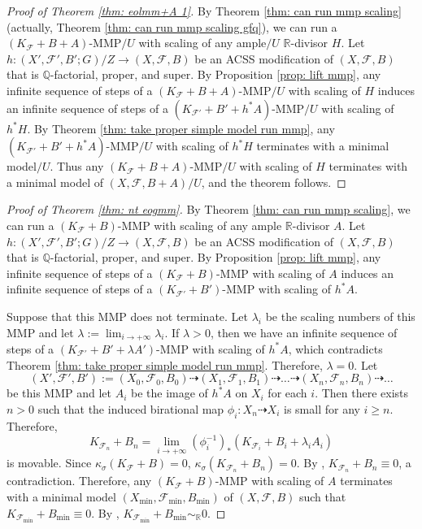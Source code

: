 \documentclass[11pt]{amsart}
\numberwithin{equation}{section}
\newcommand{\Qq}{\mathbb{Q}}
\newcommand{\Rr}{\mathbb{R}}
\newcommand{\Ff}{\mathcal{F}}
\theoremstyle{definition}
\theoremstyle{definition}
\theoremstyle{definition}
\begin{document}
\begin{proof}[Proof of Theorem \ref{thm: eolmm+A 1}]
By Theorem \ref{thm: can run mmp scaling} (actually, Theorem \ref{thm: can run mmp scaling gfq}), we can run a $(K_{\Ff}+B+A)$-MMP$/U$ with scaling of any ample$/U$ $\Rr$-divisor $H$. Let $h: (X',\Ff',B';G)/Z\rightarrow (X,\Ff,B)$ be an ACSS modification of $(X,\Ff,B)$ that is $\Qq$-factorial, proper, and super. By Proposition \ref{prop: lift mmp}, any infinite sequence of steps of a $(K_{\Ff}+B+A)$-MMP$/U$ with scaling of $H$ induces an infinite sequence of steps of a $(K_{\Ff'}+B'+h^*A)$-MMP$/U$ with scaling of $h^*H$. By Theorem \ref{thm: take proper simple model run mmp}, any $(K_{\Ff'}+B'+h^*A)$-MMP$/U$ with scaling of $h^*H$ terminates with a minimal model$/U$. Thus any $(K_{\Ff}+B+A)$-MMP$/U$ with scaling of $H$ terminates with a minimal model of $(X,\Ff,B+A)/U$, and the theorem follows.
\end{proof}

\begin{proof}[Proof of Theorem \ref{thm: nt eogmm}]
By Theorem \ref{thm: can run mmp scaling}, we can run a $(K_{\Ff}+B)$-MMP with scaling of any ample $\Rr$-divisor $A$. Let $h: (X',\Ff',B';G)/Z\rightarrow (X,\Ff,B)$ be an ACSS modification of $(X,\Ff,B)$ that is $\Qq$-factorial, proper, and super. By Proposition \ref{prop: lift mmp}, any infinite sequence of steps of a $(K_{\Ff}+B)$-MMP with scaling of $A$ induces an infinite sequence of steps of a $(K_{\Ff'}+B')$-MMP with scaling of $h^*A$. 

Suppose that this MMP does not terminate. Let $\lambda_i$ be the scaling numbers of this MMP and let $\lambda:=\lim_{i\rightarrow+\infty}\lambda_i$. If $\lambda>0$, then we have an infinite sequence of steps of a $(K_{\Ff'}+B'+\lambda A')$-MMP with scaling of $h^*A$, which contradicts Theorem \ref{thm: take proper simple model run mmp}. Therefore, $\lambda=0$. Let
$$(X',\Ff',B'):=(X_0,\Ff_0,B_0)\dashrightarrow (X_1,\Ff_1,B_1)\dashrightarrow\dots\dashrightarrow (X_n,\Ff_n,B_n)\dashrightarrow\dots$$
be this MMP and let $A_i$ be the image of $h^*A$ on $X_i$ for each $i$. Then there exists $n>0$ such that the induced birational map $\phi_i: X_n\dashrightarrow X_i$ is small for any $i\geq n$. Therefore,
$$K_{\Ff_n}+B_n=\lim_{i\rightarrow+\infty}(\phi_i^{-1})_*(K_{\Ff_i}+B_i+\lambda_i A_i)$$
is movable. Since $\kappa_{\sigma}(K_{\Ff}+B)=0$, $\kappa_{\sigma}(K_{\Ff_n}+B_n)=0$. By \cite[Lemma 4.2.4]{CHLX23}, $K_{\Ff_n}+B_n\equiv 0$, a contradiction. Therefore, any $(K_{\Ff}+B)$-MMP with scaling of $A$ terminates with a minimal model $(X_{\min},\Ff_{\min},B_{\min})$ of $(X,\Ff,B)$ such that $K_{\Ff_{\min}}+B_{\min}\equiv 0$. By \cite[Theorem 1.4]{DLM23}, $K_{\Ff_{\min}}+B_{\min}\sim_{\mathbb R}0$.
\end{proof}
\end{document}
